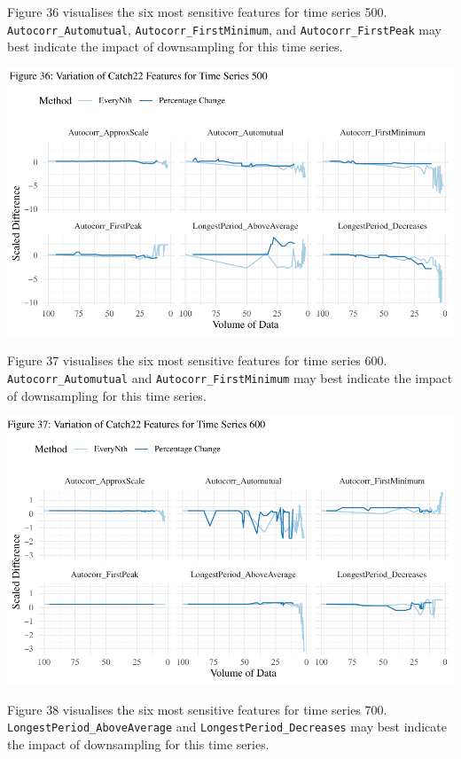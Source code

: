 \documentclass{article}
\begin{document}
Figure 36 visualises the six most sensitive features for time series
500. \texttt{Autocorr\_Automutual}, \texttt{Autocorr\_FirstMinimum}, and
\texttt{Autocorr\_FirstPeak} may best indicate the impact of
downsampling for this time series.

\includegraphics{210431461_CSC8639_Dissertation_files/figure-latex/Catch22Variation500-1.pdf}

\newpage

Figure 37 visualises the six most sensitive features for time series
600. \texttt{Autocorr\_Automutual} and \texttt{Autocorr\_FirstMinimum}
may best indicate the impact of downsampling for this time series.

\includegraphics{210431461_CSC8639_Dissertation_files/figure-latex/Catch22Variation600-1.pdf}

Figure 38 visualises the six most sensitive features for time series
700. \texttt{LongestPeriod\_AboveAverage} and
\texttt{LongestPeriod\_Decreases} may best indicate the impact of
downsampling for this time series.
\end{document}
